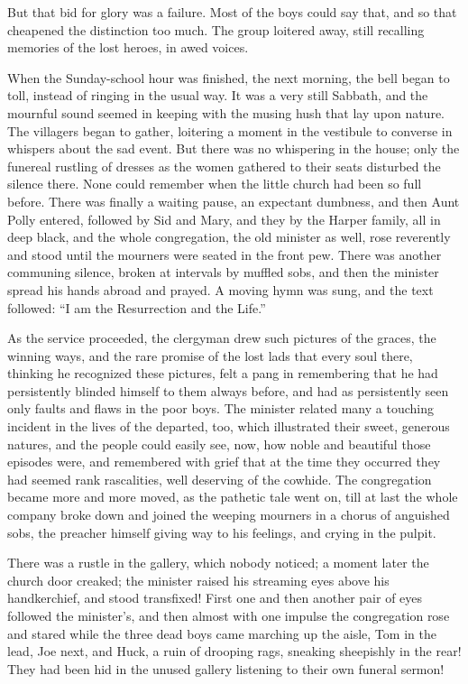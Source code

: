 \documentclass{book}
\begin{document}
But that bid for glory was a failure. Most of the boys could say that, and so that cheapened the distinction too much. The group loitered away, still recalling memories of the lost heroes, in awed voices.

When the Sunday-school hour was finished, the next morning, the bell began to toll, instead of ringing in the usual way. It was a very still Sabbath, and the mournful sound seemed in keeping with the musing hush that lay upon nature. The villagers began to gather, loitering a moment in the vestibule to converse in whispers about the sad event. But there was no whispering in the house; only the funereal rustling of dresses as the women gathered to their seats disturbed the silence there. None could remember when the little church had been so full before. There was finally a waiting pause, an expectant dumbness, and then Aunt Polly entered, followed by Sid and Mary, and they by the Harper family, all in deep black, and the whole congregation, the old minister as well, rose reverently and stood until the mourners were seated in the front pew. There was another communing silence, broken at intervals by muffled sobs, and then the minister spread his hands abroad and prayed. A moving hymn was sung, and the text followed: “I am the Resurrection and the Life.”

As the service proceeded, the clergyman drew such pictures of the graces, the winning ways, and the rare promise of the lost lads that every soul there, thinking he recognized these pictures, felt a pang in remembering that he had persistently blinded himself to them always before, and had as persistently seen only faults and flaws in the poor boys. The minister related many a touching incident in the lives of the departed, too, which illustrated their sweet, generous natures, and the people could easily see, now, how noble and beautiful those episodes were, and remembered with grief that at the time they occurred they had seemed rank rascalities, well deserving of the cowhide. The congregation became more and more moved, as the pathetic tale went on, till at last the whole company broke down and joined the weeping mourners in a chorus of anguished sobs, the preacher himself giving way to his feelings, and crying in the pulpit.

There was a rustle in the gallery, which nobody noticed; a moment later the church door creaked; the minister raised his streaming eyes above his handkerchief, and stood transfixed! First one and then another pair of eyes followed the minister’s, and then almost with one impulse the congregation rose and stared while the three dead boys came marching up the aisle, Tom in the lead, Joe next, and Huck, a ruin of drooping rags, sneaking sheepishly in the rear! They had been hid in the unused gallery listening to their own funeral sermon!
\end{document}
